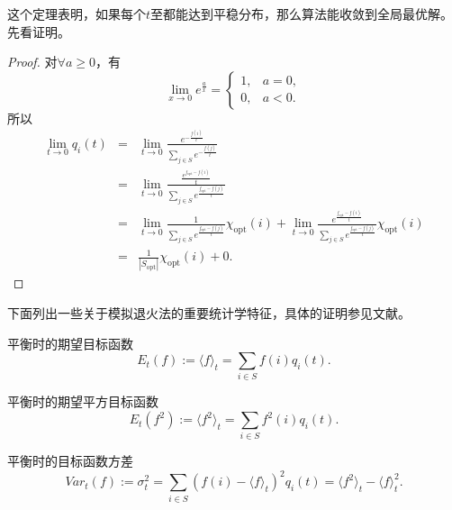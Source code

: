 这个定理表明，如果每个$t$至都能达到平稳分布，那么算法能收敛到全局最优解。先看证明。

\begin{proof}
  对$\forall a \geq 0$，有
  \begin{equation}
    \lim_{x \to 0} e^{\frac{a}{x}} = \left\{
    \begin{array}{ll}
      1, & a = 0,\\
      0, & a < 0.
    \end{array}
    \right.
  \end{equation}
  所以
  \begin{eqnarray*}
    \lim_{t \to 0}q_i(t) & = & \lim_{t \to 0}  \frac{e^{-\frac{f(i)}{t}}}
        {\sum_{j \in S} e^{-\frac{f(j)}{t}}} \\
        & = & \lim_{t \to 0} \frac{\frac{e^{f_{\mathrm{opt}} - f(i)}}{t}}
        {\sum_{j \in S} e^{\frac{f_{\mathrm{opt}} - f(j)}{t}}} \\
        & = & \lim_{t \to 0}\frac{1}{\sum_{j \in S} e^{\frac{f_{\mathrm{opt}} - f(j)}{t}}}
        \chi_{\mathrm{opt}}(i)
        + \lim_{t \to 0} \frac{e^{\frac{f_{\mathrm{opt}} - f(i)}{t}}}
        {\sum_{j \in S}e^{\frac{f_{\mathrm{opt}} - f(j)}{t}}}\chi_{\mathrm{opt}}(i)\\
        & = & \frac{1}{|S_{\mathrm{opt}}|} \chi_{\mathrm{opt}}(i) + 0. 
  \end{eqnarray*}
\end{proof}

下面列出一些关于模拟退火法的重要统计学特征，具体的证明参见文献\cite{Aarts1989Simulated}。

\begin{definition}{\hei 平衡时的期望目标函数}
  \begin{equation}
    E_t(f) := \langle f \rangle_t = \sum_{i \in S}f(i)q_i(t).
    \label{eq::Metro_esp_t_f}
  \end{equation}
\end{definition}

\begin{definition}{\hei 平衡时的期望平方目标函数}
  \begin{equation}
    E_t(f^2) := \langle f^2\rangle_t = \sum_{i \in S}f^2(i)q_i(t).
    \label{eq::Metro_esp_t_f2}
  \end{equation}
\end{definition}

\begin{definition}{\hei 平衡时的目标函数方差}
  \begin{equation}
    Var_t(f) := \sigma_t^2 = \sum_{i \in S}(f(i) - \langle f\rangle_t)^2q_i(t)
    = \langle f^2\rangle_t - \langle f\rangle_t^2.
    \label{eq::Metro_t_variation}
  \end{equation}
\end{definition}

